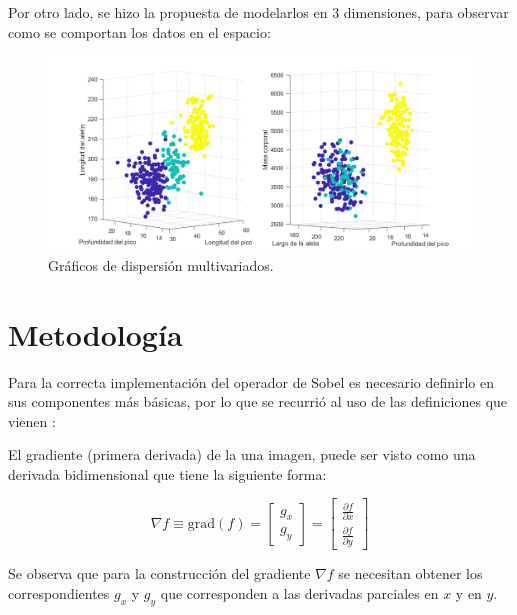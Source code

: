 \documentclass[11pt, letterpaper]{article}
\begin{document}
\newpage

Por otro lado, se hizo la propuesta de modelarlos en 3 dimensiones, para observar como se comportan los datos en el espacio:

\begin{figure}[h!]
	\centering
	\begin{minipage}{1.1\textwidth}
		\centering
		\includegraphics[width=\textwidth]{IMG/G2.png}
		\caption{Gráficos de dispersión multivariados.}
		\label{fig:f3}
	\end{minipage}\hfill
\end{figure}







	
	\newpage
	
	\section{Metodología}
	
	Para la correcta implementación del operador de Sobel es necesario definirlo en sus componentes más básicas, por lo que se recurrió al uso de las definiciones que vienen \cite{gonzalez2018digital}:
	
	El gradiente (primera derivada) de la una imagen, puede ser visto como una derivada bidimensional que tiene la siguiente forma:
	
	$$\nabla f \equiv \text{grad}(f) = \begin{bmatrix} g_x \\ g_y \end{bmatrix} = \begin{bmatrix} \frac{\partial f}{\partial x} \\ \frac{\partial f}{\partial y} \end{bmatrix}$$
	
	Se observa que para la construcción del gradiente $\nabla f$ se necesitan obtener los correspondientes $g_x$ y $g_y$ que corresponden a las derivadas parciales en $x$ y en $y$.
	
\end{document}
